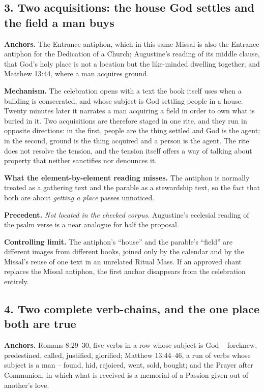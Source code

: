 \subsection*{3. Two acquisitions: the house God settles and the field a man buys}

\textbf{Anchors.} The Entrance antiphon, which in this same Missal is also the Entrance antiphon for the Dedication of a Church; Augustine's reading of its middle clause, that God's holy place is not a location but the like-minded dwelling together; and Matthew 13:44, where a man acquires ground.

\textbf{Mechanism.} The celebration opens with a text the book itself uses when a building is consecrated, and whose subject is God settling people in a house. Twenty minutes later it narrates a man acquiring a field in order to own what is buried in it. Two acquisitions are therefore staged in one rite, and they run in opposite directions: in the first, people are the thing settled and God is the agent; in the second, ground is the thing acquired and a person is the agent. The rite does not resolve the tension, and the tension itself offers a way of talking about property that neither sanctifies nor denounces it.

\textbf{What the element-by-element reading misses.} The antiphon is normally treated as a gathering text and the parable as a stewardship text, so the fact that both are about \emph{getting a place} passes unnoticed.

\textbf{Precedent.} \emph{Not located in the checked corpus.} Augustine's ecclesial reading of the psalm verse is a near analogue for half the proposal.

\textbf{Controlling limit.} The antiphon's ``house'' and the parable's ``field'' are different images from different books, joined only by the calendar and by the Missal's reuse of one text in an unrelated Ritual Mass. If an approved chant replaces the Missal antiphon, the first anchor disappears from the celebration entirely.

\subsection*{4. Two complete verb-chains, and the one place both are true}

\textbf{Anchors.} Romans 8:29--30, five verbs in a row whose subject is God -- foreknew, predestined, called, justified, glorified; Matthew 13:44--46, a run of verbs whose subject is a man -- found, hid, rejoiced, went, sold, bought; and the Prayer after Communion, in which what is received is a memorial of a Passion given out of another's love.

